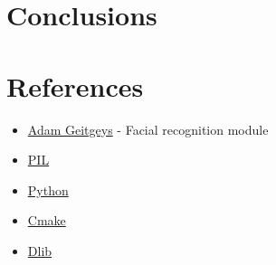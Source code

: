 \documentclass{article}
\begin{document}
\section{Conclusions}

\section{References}
\begin{itemize}
    \item \href{https://github.com/ageitgey}{Adam Geitgeys} - Facial recognition module
    \item \href{https://pillow.readthedocs.io/en/stable/}{PIL} 
    \item \href{https://www.python.org/downloads/}{Python}
    \item \href{https://cmake.org/}{Cmake}  
    \item \href{http://dlib.net/}{Dlib} 
\end{itemize}


\newpage
\printbibliography
\end{document}
